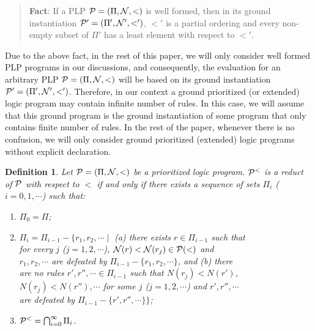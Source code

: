 \documentclass{tlp}
\newtheorem{definition}{Definition} %
\begin{document}
\begin{quote}
{\bf Fact}: If a PLP ${\cal P}=(\Pi, {\cal N}, <)$ is well formed, then
in its ground instantiation ${\cal P'}=(\Pi', {\cal N'}, <')$, $<'$ is
a partial ordering and
every non-empty subset of $\Pi'$ has a least element with respect to $<'$.
\end{quote}

Due to the above fact,
in the rest of this paper, we will only consider well formed PLP programs
in our
discussions, and consequently, the evaluation for an arbitrary
PLP ${\cal P}=(\Pi,{\cal N},<)$  will be based on its ground
instantiation ${\cal P'}=(\Pi', {\cal N'}, <')$. Therefore, in our context
a ground prioritized (or extended) logic program may contain
infinite number of rules. In this case, we will assume that
this ground program is the ground instantiation of
some program that only contains
finite number of rules. In the rest of the paper, whenever
there is no confusion, we will only consider
ground prioritized (extended) logic programs without explicit 
declaration.

\begin{definition}
\cite{yan:plp}
Let ${\cal P}=(\Pi,{\cal N},<)$ be a prioritized logic program.
${\cal P}^{<}$ is a {\em reduct} of $\cal P$ with respect to $<$
if and only if there exists a sequence of sets $\Pi_{i}$
($i=0, 1, \cdots$) such that:
\begin{enumerate}
\item $\Pi_{0}=\Pi$;
\item $\Pi_{i}=\Pi_{i-1}-\{r_{1},r_{2},\cdots \mid$ (a)
there exists $r\in \Pi_{i-1}$ such that \\
\hspace*{.2in} for every $j$ ($j=1,2, \cdots$),
${\cal N}(r)<{\cal N}(r_{j})\in {\cal P}(<)$ and \\
\hspace*{.2in} $r_{1}, r_2, \cdots$
are defeated by $\Pi_{i-1}-\{r_{1}, r_{2}, \cdots\}$, and (b) there \\
\hspace*{.2in} are no rules $r',r'', \cdots \in\Pi_{i-1}$
such that $N(r_{j})<N(r')$, \\
\hspace*{.2in} $N(r_{j})<N(r''),\cdots$ 
for some $j$ ($j=1, 2, \cdots$)
and $r', r'', \cdots$ \\
\hspace*{.2in} are defeated by $\Pi_{i-1}-\{r', r'', \cdots\} \}$;
\item ${\cal P}^{<}=\bigcap_{i=0}^{\infty} \Pi_{i}$.
\end{enumerate}
\end{definition}
\end{document}
